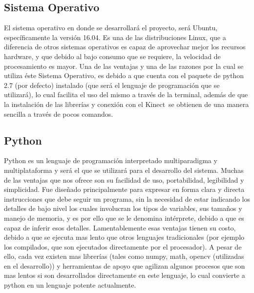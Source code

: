 \documentclass[a4paper,openright,12pt]{report}
\begin{document}
\subsection{Sistema Operativo}
El sistema operativo en donde se desarrollará el proyecto, será Ubuntu, específicamente la versión 16.04. Es una de las distribuciones Linux, que a diferencia de otros sistemas operativos es capaz de aprovechar mejor los recursos hardware, y que debido al bajo consumo que se requiere, la velocidad de procesamiento es mayor. Una de las ventajas y una de las razones por la cual se utiliza éste Sistema Operativo, es debido a que cuenta con el paquete de python 2.7 (por defecto) instalado (que será el lenguaje de programación que se utilizará), lo cual facilita el uso del mismo a través de la terminal, además de que la instalación de las librerías y conexión con el Kinect\textcopyright\ se obtienen de una manera sencilla a través de pocos comandos. 
\subsection{Python}
Python es un lenguaje de programación interpretado multiparadigma y multiplataforma y será el que se utilizará para el desarrollo del sistema. Muchas de las ventajas que nos ofrece son su facilidad de uso, portabilidad, legibilidad y simplicidad. Fue diseñado principalmente para expresar en forma clara y directa instrucciones que debe seguir un programa, sin la necesidad de estar indicando los detalles de bajo nivel los cuales involucran los tipos de variables, sus tamaños y manejo de memoria, y es por ello que se le denomina intérprete, debido a que es capaz de inferir esos detalles. Lamentablemente esas ventajas tienen su costo, debido a que se ejecuta mas lento que otros lenguajes tradicionales (por ejemplo los compilados, que son ejecutados directamente por el procesador). A pesar de ello, cada vez existen mas librerías (tales como numpy, math, opencv (utilizadas en el desarrollo)) y herramientas de apoyo que agilizan algunos procesos que son mas lentos si son desarrollados directamente en este lenguaje, lo cual convierte a python en un lenguaje potente actualmente. 
\end{document}
